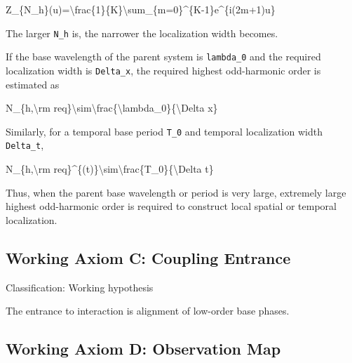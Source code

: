 \documentclass[
  a4paper,
]{article}
\newenvironment{Shaded}{}{}
\newcommand{\NormalTok}[1]{#1}
\begin{document}
\begin{Shaded}
\begin{Highlighting}[]
\NormalTok{Z\_\{N\_h\}(u)=\textbackslash{}frac\{1\}\{K\}\textbackslash{}sum\_\{m=0\}\^{}\{K{-}1\}e\^{}\{i(2m+1)u\}}
\end{Highlighting}
\end{Shaded}

The larger \texttt{N\_h} is, the narrower the localization width
becomes.

If the base wavelength of the parent system is \texttt{lambda\_0} and
the required localization width is \texttt{Delta\_x}, the required
highest odd-harmonic order is estimated as

\begin{Shaded}
\begin{Highlighting}[]
\NormalTok{N\_\{h,\textbackslash{}rm req\}\textbackslash{}sim\textbackslash{}frac\{\textbackslash{}lambda\_0\}\{\textbackslash{}Delta x\}}
\end{Highlighting}
\end{Shaded}

Similarly, for a temporal base period \texttt{T\_0} and temporal
localization width \texttt{Delta\_t},

\begin{Shaded}
\begin{Highlighting}[]
\NormalTok{N\_\{h,\textbackslash{}rm req\}\^{}\{(t)\}\textbackslash{}sim\textbackslash{}frac\{T\_0\}\{\textbackslash{}Delta t\}}
\end{Highlighting}
\end{Shaded}

Thus, when the parent base wavelength or period is very large, extremely
large highest odd-harmonic order is required to construct local spatial
or temporal localization.

\subsection{Working Axiom C: Coupling
Entrance}\label{working-axiom-c-coupling-entrance}

Classification: Working hypothesis

The entrance to interaction is alignment of low-order base phases.

\subsection{Working Axiom D: Observation
Map}\label{working-axiom-d-observation-map}
\end{document}
